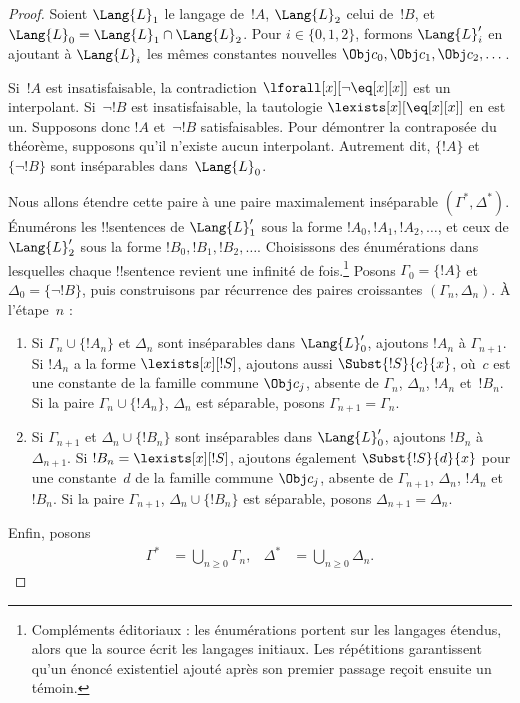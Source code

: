 \documentclass[../../../include/open-logic-section]{subfiles}
\begin{document}
\begin{proof}
Soient $\Lang{L}_1$ le langage de~$!A$,
$\Lang{L}_2$ celui de~$!B$, et
$\Lang{L}_0=\Lang{L}_1\cap\Lang{L}_2$.
Pour $i\in\{0,1,2\}$, formons
$\Lang{L}'_i$ en ajoutant à
$\Lang{L}_i$ les mêmes constantes
nouvelles $\Obj c_0,\Obj c_1,\Obj c_2,\dots$.

Si~$!A$ est insatisfaisable, la
contradiction $\lforall[x][\lnot\eq[x][x]]$
est un interpolant. Si~$\lnot !B$ est
insatisfaisable, la tautologie
$\lexists[x][\eq[x][x]]$ en est un.
Supposons donc $!A$ et~$\lnot !B$
satisfaisables. Pour démontrer la
contraposée du théorème, supposons
qu'il n'existe aucun interpolant.
Autrement dit, $\{!A\}$ et
$\{\lnot !B\}$ sont inséparables
dans~$\Lang{L}_0$.

Nous allons étendre cette paire à
une paire maximalement inséparable
$(\Gamma^*,\Delta^*)$.
Énumérons les !!{sentence}s de
$\Lang{L}'_1$ sous la forme
$!A_0,!A_1,!A_2,\dots$, et ceux de
$\Lang{L}'_2$ sous la forme
$!B_0,!B_1,!B_2,\dots$.
Choisissons des énumérations dans
lesquelles chaque !!{sentence}
revient une infinité de fois.\footnote{Compléments éditoriaux : les énumérations portent sur les langages étendus, alors que la source écrit les langages initiaux. Les répétitions garantissent qu'un énoncé existentiel ajouté après son premier passage reçoit ensuite un témoin.}
Posons $\Gamma_0=\{!A\}$ et
$\Delta_0=\{\lnot !B\}$, puis
construisons par récurrence des paires
croissantes $(\Gamma_n,\Delta_n)$.
À l'étape~$n$ :
\begin{enumerate}
\item Si $\Gamma_n\cup\{!A_n\}$ et
  $\Delta_n$ sont inséparables dans
  $\Lang{L}'_0$, ajoutons $!A_n$ à
  $\Gamma_{n+1}$. Si $!A_n$ a la forme
  $\lexists[x][!S]$, ajoutons aussi
  $\Subst{!S}{c}{x}$, où~$c$ est
  une constante de la famille commune $\Obj c_j$, absente de
  $\Gamma_n$, $\Delta_n$, $!A_n$
  et~$!B_n$. Si la paire $\Gamma_n\cup\{!A_n\}$, $\Delta_n$ est séparable,
  posons $\Gamma_{n+1}=\Gamma_n$.
\item Si $\Gamma_{n+1}$ et
  $\Delta_n\cup\{!B_n\}$ sont
  inséparables dans $\Lang{L}'_0$,
  ajoutons $!B_n$ à $\Delta_{n+1}$.
  Si $!B_n=\lexists[x][!S]$, ajoutons
  également $\Subst{!S}{d}{x}$ pour
  une constante~$d$ de la famille commune $\Obj c_j$, absente
  de $\Gamma_{n+1}$, $\Delta_n$,
  $!A_n$ et~$!B_n$. Si la paire $\Gamma_{n+1}$, $\Delta_n\cup\{!B_n\}$ est séparable, posons
  $\Delta_{n+1}=\Delta_n$.
\end{enumerate}
Enfin, posons
\begin{align*}
  \Gamma^*&=\bigcup_{n\geq0}\Gamma_n,
  &
  \Delta^*&=\bigcup_{n\geq0}\Delta_n.
\end{align*}


\end{proof}
\end{document}
